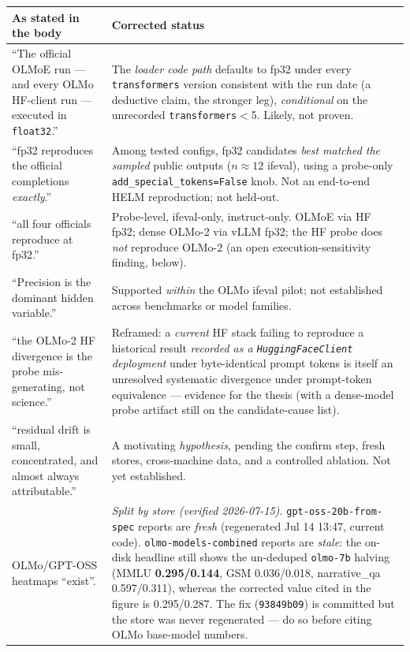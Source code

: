\documentclass[11pt]{report}
\newcommand{\code}[1]{\texttt{#1}}
\begin{document}
\begin{longtable}{@{}p{}p{}@{}}
\toprule
\textbf{As stated in the body} & \textbf{Corrected status} \\
\midrule
\endhead
``The official OLMoE run --- and every OLMo HF-client run --- executed in
\code{float32}.'' & The \emph{loader code path} defaults to fp32 under every
\code{transformers} version consistent with the run date (a deductive claim, the
stronger leg), \emph{conditional} on the unrecorded \code{transformers}$<$5. Likely,
not proven. \\
``fp32 reproduces the official completions \emph{exactly}.'' & Among tested configs,
fp32 candidates \emph{best matched the sampled} public outputs ($n\approx12$ ifeval),
using a probe-only \code{add\_special\_tokens=False} knob. Not an end-to-end HELM
reproduction; not held-out. \\
``all four officials reproduce at fp32.'' & Probe-level, ifeval-only, instruct-only.
OLMoE via HF fp32; dense OLMo-2 via vLLM fp32; the HF probe does \emph{not} reproduce
OLMo-2 (an open execution-sensitivity finding, below). \\
``Precision is the dominant hidden variable.'' & Supported \emph{within} the OLMo
ifeval pilot; not established across benchmarks or model families. \\
``the OLMo-2 HF divergence is the probe mis-generating, not science.'' & Reframed: a
\emph{current} HF stack failing to reproduce a historical result \emph{recorded as a
\code{HuggingFaceClient} deployment} under byte-identical prompt tokens is itself an
unresolved systematic divergence under prompt-token equivalence --- evidence for the
thesis (with a dense-model probe artifact still on the candidate-cause list). \\
``residual drift is small, concentrated, and almost always attributable.'' & A
motivating \emph{hypothesis}, pending the confirm step, fresh stores, cross-machine
data, and a controlled ablation. Not yet established. \\
OLMo/GPT-OSS heatmaps ``exist''. & \emph{Split by store (verified 2026-07-15).}
\code{gpt-oss-20b-from-spec} reports are \emph{fresh} (regenerated Jul 14 13:47,
current code). \code{olmo-models-combined} reports are \emph{stale}: the on-disk
headline still shows the un-deduped \code{olmo-7b} halving (MMLU \textbf{0.295/0.144},
GSM 0.036/0.018, narrative\_qa 0.597/0.311), whereas the corrected value cited in the
figure is 0.295/0.287. The fix (\code{93849b09}) is committed but the store was never
regenerated --- do so before citing OLMo base-model numbers. \\
\bottomrule
\end{longtable}
\end{document}

